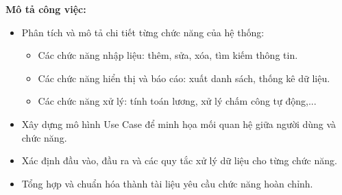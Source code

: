 {\begin{minipage}{\textwidth}
    \noindent \textbf{Mô tả công việc:}
    \begin{itemize}
        \item Phân tích và mô tả chi tiết từng chức năng của hệ thống:
        \begin{itemize}
            \item Các chức năng nhập liệu: thêm, sửa, xóa, tìm kiếm thông tin.
            \item Các chức năng hiển thị và báo cáo: xuất danh sách, thống kê dữ liệu.
            \item Các chức năng xử lý: tính toán lương, xử lý chấm công tự động,...
        \end{itemize}
        \item Xây dựng mô hình Use Case để minh họa mối quan hệ giữa người dùng và chức năng.
        \item Xác định đầu vào, đầu ra và các quy tắc xử lý dữ liệu cho từng chức năng.
        \item Tổng hợp và chuẩn hóa thành tài liệu yêu cầu chức năng hoàn chỉnh.
    \end{itemize}
    \end{minipage}
}
\newpage %
